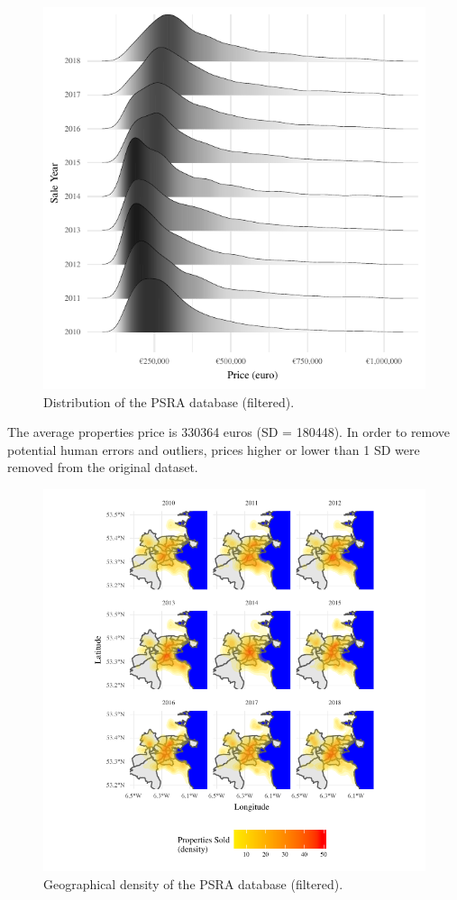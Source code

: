 \documentclass[]{elsarticle} %
\begin{document}
\begin{figure}[H]
\includegraphics{property_price_paper_new_files/figure-latex/distrib-plot-1} \caption{Distribution of the PSRA database (filtered).}\label{fig:distrib-plot}
\end{figure}

The average properties price is 330364 euros (SD = 180448). In order to
remove potential human errors and outliers, prices higher or lower than
1 SD were removed from the original dataset.

\begin{figure}[H]
\includegraphics{property_price_paper_new_files/figure-latex/density-plot-1} \caption{Geographical density of the PSRA database (filtered).}\label{fig:density-plot}
\end{figure}
\end{document}

